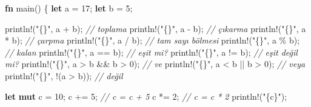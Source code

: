 \documentclass[12pt,a4paper]{article}
\newenvironment{Shaded}{}{}
\newcommand{\CommentTok}[1]{\textcolor[rgb]{0.38,0.63,0.69}{\textit{#1}}}
\newcommand{\DecValTok}[1]{\textcolor[rgb]{0.25,0.63,0.44}{#1}}
\newcommand{\FunctionTok}[1]{\textcolor[rgb]{0.02,0.16,0.49}{#1}}
\newcommand{\KeywordTok}[1]{\textcolor[rgb]{0.00,0.44,0.13}{\textbf{#1}}}
\newcommand{\NormalTok}[1]{#1}
\newcommand{\OperatorTok}[1]{\textcolor[rgb]{0.40,0.40,0.40}{#1}}
\newcommand{\StringTok}[1]{\textcolor[rgb]{0.25,0.44,0.63}{#1}}
\begin{document}
\begin{Shaded}
\begin{Highlighting}[]
\KeywordTok{fn} \FunctionTok{main}\OperatorTok{()} \OperatorTok{\{}
    \KeywordTok{let}\NormalTok{ a }\OperatorTok{=} \DecValTok{17}\OperatorTok{;}
    \KeywordTok{let}\NormalTok{ b }\OperatorTok{=} \DecValTok{5}\OperatorTok{;}

\NormalTok{    println}\OperatorTok{!(}\StringTok{"\{\}"}\OperatorTok{,}\NormalTok{ a }\OperatorTok{+}\NormalTok{ b}\OperatorTok{);}            \CommentTok{// toplama}
\NormalTok{    println}\OperatorTok{!(}\StringTok{"\{\}"}\OperatorTok{,}\NormalTok{ a }\OperatorTok{-}\NormalTok{ b}\OperatorTok{);}            \CommentTok{// çıkarma}
\NormalTok{    println}\OperatorTok{!(}\StringTok{"\{\}"}\OperatorTok{,}\NormalTok{ a }\OperatorTok{*}\NormalTok{ b}\OperatorTok{);}            \CommentTok{// çarpma}
\NormalTok{    println}\OperatorTok{!(}\StringTok{"\{\}"}\OperatorTok{,}\NormalTok{ a }\OperatorTok{/}\NormalTok{ b}\OperatorTok{);}            \CommentTok{// tam sayı bölmesi}
\NormalTok{    println}\OperatorTok{!(}\StringTok{"\{\}"}\OperatorTok{,}\NormalTok{ a }\OperatorTok{\%}\NormalTok{ b}\OperatorTok{);}            \CommentTok{// kalan}
\NormalTok{    println}\OperatorTok{!(}\StringTok{"\{\}"}\OperatorTok{,}\NormalTok{ a }\OperatorTok{==}\NormalTok{ b}\OperatorTok{);}           \CommentTok{// eşit mi?}
\NormalTok{    println}\OperatorTok{!(}\StringTok{"\{\}"}\OperatorTok{,}\NormalTok{ a }\OperatorTok{!=}\NormalTok{ b}\OperatorTok{);}           \CommentTok{// eşit değil mi?}
\NormalTok{    println}\OperatorTok{!(}\StringTok{"\{\}"}\OperatorTok{,}\NormalTok{ a }\OperatorTok{\textgreater{}}\NormalTok{ b }\OperatorTok{\&\&}\NormalTok{ b }\OperatorTok{\textgreater{}} \DecValTok{0}\OperatorTok{);}   \CommentTok{// ve}
\NormalTok{    println}\OperatorTok{!(}\StringTok{"\{\}"}\OperatorTok{,}\NormalTok{ a }\OperatorTok{\textless{}}\NormalTok{ b }\OperatorTok{||}\NormalTok{ b }\OperatorTok{\textgreater{}} \DecValTok{0}\OperatorTok{);}   \CommentTok{// veya}
\NormalTok{    println}\OperatorTok{!(}\StringTok{"\{\}"}\OperatorTok{,} \OperatorTok{!(}\NormalTok{a }\OperatorTok{\textgreater{}}\NormalTok{ b}\OperatorTok{));}         \CommentTok{// değil}

    \KeywordTok{let} \KeywordTok{mut}\NormalTok{ c }\OperatorTok{=} \DecValTok{10}\OperatorTok{;}
\NormalTok{    c }\OperatorTok{+=} \DecValTok{5}\OperatorTok{;}                           \CommentTok{// c = c + 5}
\NormalTok{    c }\OperatorTok{*=} \DecValTok{2}\OperatorTok{;}                           \CommentTok{// c = c * 2}
\NormalTok{    println}\OperatorTok{!(}\StringTok{"\{c\}"}\OperatorTok{);}


\end{Highlighting}
\end{Shaded}
\end{document}
